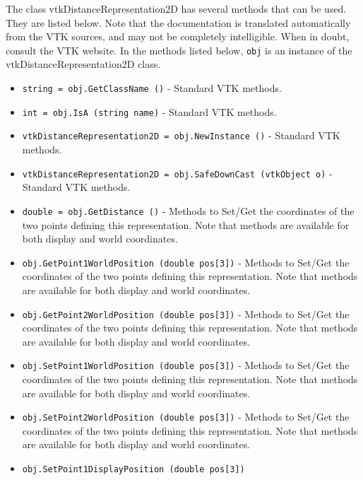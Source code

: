 The class vtkDistanceRepresentation2D has several methods that can be used.
  They are listed below.
Note that the documentation is translated automatically from the VTK sources,
and may not be completely intelligible.  When in doubt, consult the VTK website.
In the methods listed below, \verb|obj| is an instance of the vtkDistanceRepresentation2D class.
\begin{itemize}
\item  \verb|string = obj.GetClassName ()| -  Standard VTK methods.

\item  \verb|int = obj.IsA (string name)| -  Standard VTK methods.

\item  \verb|vtkDistanceRepresentation2D = obj.NewInstance ()| -  Standard VTK methods.

\item  \verb|vtkDistanceRepresentation2D = obj.SafeDownCast (vtkObject o)| -  Standard VTK methods.

\item  \verb|double = obj.GetDistance ()| -  Methods to Set/Get the coordinates of the two points defining
 this representation. Note that methods are available for both
 display and world coordinates.

\item  \verb|obj.GetPoint1WorldPosition (double pos[3])| -  Methods to Set/Get the coordinates of the two points defining
 this representation. Note that methods are available for both
 display and world coordinates.

\item  \verb|obj.GetPoint2WorldPosition (double pos[3])| -  Methods to Set/Get the coordinates of the two points defining
 this representation. Note that methods are available for both
 display and world coordinates.

\item  \verb|obj.SetPoint1WorldPosition (double pos[3])| -  Methods to Set/Get the coordinates of the two points defining
 this representation. Note that methods are available for both
 display and world coordinates.

\item  \verb|obj.SetPoint2WorldPosition (double pos[3])| -  Methods to Set/Get the coordinates of the two points defining
 this representation. Note that methods are available for both
 display and world coordinates.

\item  \verb|obj.SetPoint1DisplayPosition (double pos[3])|


\end{itemize}

